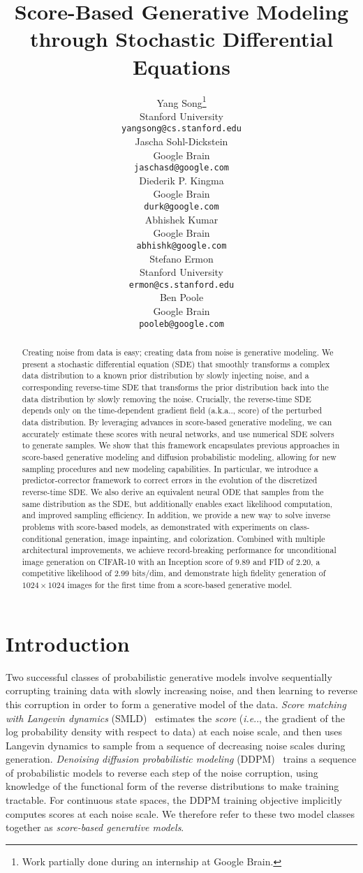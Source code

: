 \documentclass{article} \usepackage{iclr2021_conference,times}
\title{Score-Based Generative Modeling through Stochastic Differential Equations}
\author{Yang Song\thanks{Work partially done during an internship at Google Brain.}\\
Stanford University\\
\texttt{yangsong@cs.stanford.edu}\\
\And 
Jascha Sohl-Dickstein\\
Google Brain\\
\texttt{jaschasd@google.com}\\
\And
Diederik P. Kingma \\
Google Brain\\
\texttt{durk@google.com}\\
\AND
Abhishek Kumar \\
Google Brain\\
\texttt{abhishk@google.com}\\
\And 
Stefano Ermon \\
Stanford University\\
\texttt{ermon@cs.stanford.edu}\\
\And
Ben Poole\\
Google Brain\\
\texttt{pooleb@google.com}
}
\makeatletter
\def\@onedot{\ifx\@let@token.\else.\null\fi\xspace}
\DeclareRobustCommand\onedot{\futurelet\@let@token\@onedot}
\def\ie{\emph{i.e}\onedot}
\def\aka{a.k.a\onedot}
\makeatother
\begin{document}
\maketitle

\begin{abstract}
Creating noise from data is easy; creating data from noise is generative modeling. We present a stochastic differential equation (SDE) that smoothly transforms a complex data distribution to a known prior distribution by slowly injecting noise, and a corresponding reverse-time SDE that transforms the prior distribution back into the data distribution by slowly removing the noise. 
Crucially, the reverse-time SDE depends only on the time-dependent gradient field (\aka, score) of the perturbed data distribution. By leveraging advances in score-based generative modeling, we can accurately estimate these scores with neural networks, and use numerical SDE solvers to generate samples. We show that this framework encapsulates previous approaches in score-based generative modeling and diffusion probabilistic modeling, allowing for new sampling procedures and new modeling capabilities. In particular, we introduce a predictor-corrector framework to correct errors in the evolution of the discretized reverse-time SDE. We also derive an equivalent neural ODE that samples from the same distribution as the SDE, but additionally enables exact likelihood computation, and improved sampling efficiency. In addition, we provide a new way to solve inverse problems with score-based models, 
as demonstrated with experiments on class-conditional generation, image inpainting, and colorization. Combined with multiple architectural improvements, we achieve record-breaking performance for unconditional image generation on CIFAR-10 with an Inception score of 9.89 and FID of 2.20, a competitive likelihood of 2.99 bits/dim, and demonstrate high fidelity generation of $1024\times 1024$ images for the first time from a score-based generative model.
\end{abstract} \section{Introduction}



Two successful classes of probabilistic generative models involve sequentially corrupting training data with slowly increasing noise, and then learning to reverse this corruption in order to form a generative model of the data. 
\emph{Score matching with Langevin dynamics} (SMLD)~\citep{song2019generative} estimates the \emph{score} (\ie, the gradient of the log probability density with respect to data) at each noise scale, and then uses Langevin dynamics to sample from a sequence of decreasing noise scales during generation. 
\emph{Denoising diffusion probabilistic modeling} (DDPM)~\citep{sohl2015deep,ho2020denoising} trains a sequence of probabilistic models to reverse each step of the noise corruption, 
using knowledge of the functional form of the reverse distributions to make training tractable. 
For continuous state spaces, the DDPM training objective implicitly computes 
scores at each noise scale. 
We therefore refer to these two model classes together as \emph{score-based generative models}. 
\end{document}
